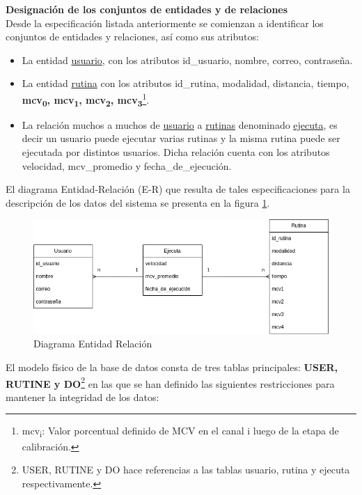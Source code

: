 \textbf{Designación de los conjuntos de entidades y de relaciones}\\
Desde la especificación listada anteriormente se comienzan a
identificar los conjuntos de entidades y relaciones, así como sus atributos:
\begin{itemize}
    \item La entidad \underline{usuario}, con los atributos id\_usuario, nombre, correo, contraseña.
    \item La entidad \underline{rutina} con los atributos id\_rutina, modalidad, distancia, tiempo, \textbf{mcv\textsubscript{0}, mcv\textsubscript{1}, mcv\textsubscript{2}, mcv\textsubscript{3}}\footnote{mcv\textsubscript{i}: Valor porcentual definido de MCV en el canal i luego de la etapa de calibración.}.
    \item La relación muchos a muchos de \underline{usuario} a \underline{rutinas} denominado \underline{ejecuta}, es decir un usuario puede ejecutar 
    varias rutinas y la misma rutina puede ser ejecutada por distintos usuarios. Dicha relación cuenta con los atributos velocidad, mcv\_promedio y fecha\_de\_ejecución. 
\end{itemize}
    
El diagrama Entidad-Relación (E-R) que resulta de tales especificaciones para la descripción de los datos del sistema se presenta en la figura \ref{fig: diagram-er}.
\begin{figure}[ht]
    \centering
    \includegraphics[scale=0.48]{images/diagram-er.png}
    \caption{Diagrama Entidad Relación}
    \label{fig: diagram-er}
\end{figure}

El modelo físico de la base de datos consta de tres tablas principales: \textbf{USER, RUTINE y DO}\footnote{USER, RUTINE y DO hace referencias a las tablas usuario, rutina y ejecuta respectivamente.} en las que se han definido las siguientes restricciones para mantener la integridad de los datos:


